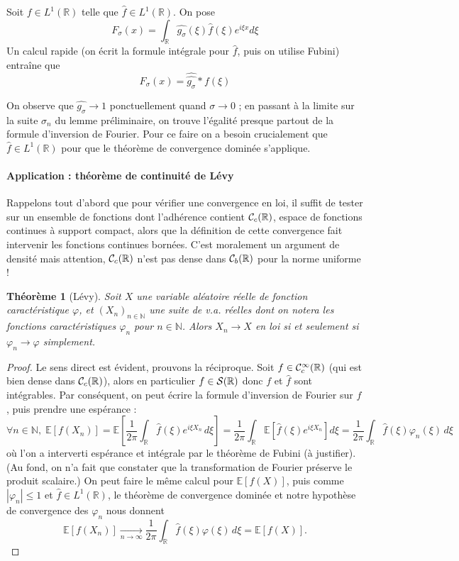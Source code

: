 \documentclass[a4paper, 11pt]{article}
\def\N{\mathbb{N}}
\def\R{\mathbb{R}}
\def\S{{\cal{S}}}
\def\Cf{{\cal{C}}}
\def\E{\mathbb{E}}
\newtheorem*{theorem}{Théorème}
\begin{document}
Soit $f \in L^1(\R)$ telle que $\hat{f} \in L^1(\R)$. On pose
\[ F_\sigma(x) = \int_\R \widehat{g_\sigma}(\xi)\hat{f}(\xi)e^{i\xi x} d\xi \]
Un calcul rapide (on écrit la formule intégrale pour $\hat{f}$, puis on utilise
Fubini) entraîne que
\[ F_\sigma(x) = \widehat{\widehat{g_\sigma}} * f(\xi) \]

On observe que $\widehat{g_\sigma} \longrightarrow 1$ ponctuellement quand
$\sigma \to 0$ ; en passant à la limite sur la suite $\sigma_n$ du lemme
préliminaire, on trouve l'égalité presque partout de la formule d'inversion de
Fourier. Pour ce faire on a besoin crucialement que $\hat{f} \in L^1(\R)$ pour
que le théorème de convergence dominée s'applique.

\paragraph{Application : théorème de continuité de Lévy} Rappelons tout d'abord
que pour vérifier une convergence en loi, il suffit de tester sur un ensemble de
fonctions dont l'adhérence contient $\Cf_c(\R)$, espace de fonctions continues
à support compact, alors que la définition de cette convergence fait intervenir
les fonctions continues bornées. C'est moralement un argument de densité mais
attention, $\Cf_c(\R)$ n'est pas dense dans $\Cf_b(\R)$ pour la norme uniforme !

\begin{theorem}[Lévy]
  Soit $X$ une variable aléatoire réelle de fonction caractéristique $\varphi$, et
  $(X_n)_{n \in \N}$ une suite de v.a. réelles dont on notera les fonctions
  caractéristiques $\varphi_n$ pour $n \in \N$. Alors $X_n \rightarrow X$ en loi si
  et seulement si $\varphi_n \rightarrow \varphi$ simplement.
\end{theorem}
\begin{proof}
  Le sens direct est évident, prouvons la réciproque. Soit $f \in
  \Cf^\infty_c(\R)$ (qui est bien dense dans $\Cf_c(\R)$), alors en particulier
  $f \in \S(\R)$ donc $f$ et $\hat{f}$ sont intégrables. Par conséquent, on peut
  écrire la formule d'inversion de Fourier sur $f$, puis prendre une espérance :
  \[ \forall n \in \N,\; \E[ f(X_n) ] = 
    \E\left[ \frac{1}{2\pi} \int_\R \hat{f}(\xi) e^{i\xi X_n}\,d\xi \right] =
    \frac{1}{2\pi} \int_\R \E\left[ \hat{f}(\xi) e^{i\xi X_n} \right] d\xi =
    \frac{1}{2\pi} \int_\R \hat{f}(\xi) \varphi_n(\xi)\, d\xi
  \]
  où l'on a interverti espérance et intégrale par le théorème de Fubini (à
  justifier). (Au fond, on n'a fait que constater que la transformation de
  Fourier préserve le produit scalaire.) On peut faire le même calcul pour
  $\E[f(X)]$, puis comme $|\varphi_n| \leq 1$ et $\hat{f} \in L^1(\R)$, le théorème
  de convergence dominée et notre  hypothèse de convergence des $\varphi_n$ nous
  donnent
  \[ \E[ f(X_n) ] \xrightarrow[n \to \infty]{}
    \frac{1}{2\pi} \int_\R \hat{f}(\xi) \varphi(\xi)\, d\xi = \E[f(X)].  \]
\end{proof}
\end{document}
